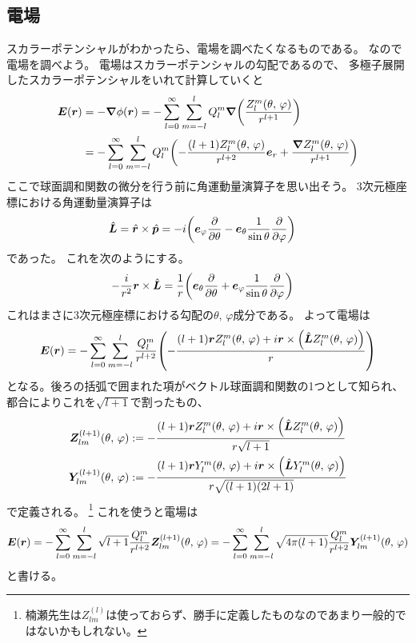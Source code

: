 \documentclass[../../master.tex]{subfiles}
\begin{document}
\subsection{電場}
スカラーポテンシャルがわかったら、電場を調べたくなるものである。
なので電場を調べよう。
電場はスカラーポテンシャルの勾配であるので、
多極子展開したスカラーポテンシャルをいれて計算していくと
\begin{equation}\begin{aligned}[b]
    \vb*{E}(\vb*{r}) &= -\grad \phi(\vb*{r})
    = -\sum_{l=0}^{\infty} \sum_{m=-l}^{l} Q_l^m \grad\qty(\frac{Z_l^m(\theta,\,\varphi)}{r^{l+1}})\\
    &= -\sum_{l=0}^{\infty} \sum_{m=-l}^{l} Q_l^m \qty(-\frac{(l+1)Z_l^m(\theta,\,\varphi)}{r^{l+2}}\vb*{e}_r+\frac{\grad Z_l^m(\theta,\,\varphi)}{r^{l+1}})
\end{aligned}\end{equation}
ここで球面調和関数の微分を行う前に角運動量演算子を思い出そう。
3次元極座標における角運動量演算子は
\begin{align}
    \hat{\vb*{L}} &= \hat{\vb*{r}} \times \hat{\vb*{p}}
    = -i\qty(\vb*{e}_\varphi \pdv{\theta} -\vb*{e}_\theta \frac{1}{\sin\theta}\pdv{\varphi})
\end{align}
であった。
これを次のようにする。
\begin{align}
    -\frac{i}{r^2}\vb*{r} \times \hat{\vb*{L}} &= \frac{1}{r}\qty(\vb*{e}_\theta \pdv{\theta} +\vb*{e}_\varphi \frac{1}{\sin\theta}\pdv{\varphi})
\end{align}
これはまさに3次元極座標における勾配の\(\theta,\,\varphi\)成分である。
よって電場は
\begin{equation}
    \vb*{E}(\vb*{r}) = -\sum_{l=0}^{\infty} \sum_{m=-l}^{l}\frac{Q_l^m}{r^{l+2}}
    \qty(-\frac{(l+1)\vb*{r}Z_l^m(\theta,\,\varphi)+i\vb*{r}\times\qty(\hat{\vb*{L}}Z_l^m(\theta,\,\varphi))}{r})
\end{equation}
となる。後ろの括弧で囲まれた項がベクトル球面調和関数の1つとして知られ、
都合によりこれを\(\sqrt{l+1}\)で割ったもの、
\begin{align}
    \vb*{Z}_{lm}^{(l+1)}(\theta,\,\varphi) &:=-\frac{(l+1)\vb*{r}Z_l^m(\theta,\,\varphi)+i\vb*{r}\times\qty(\hat{\vb*{L}}Z_l^m(\theta,\,\varphi))}{r\sqrt{l+1}}\\
    \vb*{Y}_{lm}^{(l+1)}(\theta,\,\varphi) &:=-\frac{(l+1)\vb*{r}Y_l^m(\theta,\,\varphi)+i\vb*{r}\times\qty(\hat{\vb*{L}}Y_l^m(\theta,\,\varphi))}{r\sqrt{(l+1)(2l+1)}}\\
\end{align}
で定義される。
\footnote{楠瀬先生は\(Z_{lm}^{(l)}\)は使っておらず、勝手に定義したものなのであまり一般的ではないかもしれない。}
これを使うと電場は
\begin{align}
    \vb*{E}(\vb*{r})
    = -\sum_{l=0}^{\infty} \sum_{m=-l}^{l}\sqrt{l+1}\frac{Q_l^m}{r^{l+2}} \vb*{Z}_{lm}^{(l+1)}(\theta,\,\varphi)
    = -\sum_{l=0}^{\infty} \sum_{m=-l}^{l}\sqrt{4\pi(l+1)}\frac{Q_l^m}{r^{l+2}} \vb*{Y}_{lm}^{(l+1)}(\theta,\,\varphi)\\
\end{align}
と書ける。
\end{document}
